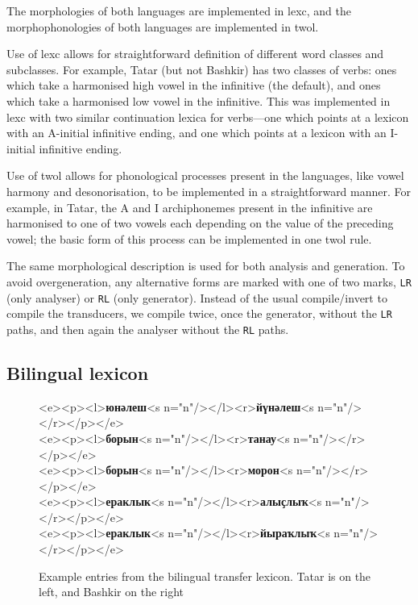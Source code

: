 \documentclass[11pt,a4paper]{article}
\begin{document}
The morphologies of both languages are implemented in lexc, and the morphophonologies of both languages are implemented in twol.

Use of lexc allows for straightforward definition of different word classes and subclasses.  For example, Tatar (but not Bashkir) has two classes of verbs: ones which take a harmonised high vowel in the infinitive (the default), and ones which take a harmonised low vowel in the infinitive.  This was implemented in lexc with two similar continuation lexica for verbs---one which points at a lexicon with an A-initial infinitive ending, and one which points at a lexicon with an I-initial infinitive ending.

Use of twol allows for phonological processes present in the languages, like vowel harmony and desonorisation, to be implemented in a straightforward manner.  For example, in Tatar, the A and I archiphonemes present in the infinitive are harmonised to one of two vowels each depending on the value of the preceding vowel; the basic form of this process can be implemented in one twol rule.

The same morphological description is used for both analysis and generation. To avoid overgeneration, any alternative forms are 
marked with one of two marks, {\tt {\small LR}} (only analyser) or {\tt {\small RL}} (only generator). Instead of the usual
compile/invert to compile the transducers, we compile twice, once the generator, without the {\tt {\small LR}} paths, and
then again the analyser without the {\tt {\small RL}} paths. 

\subsection{Bilingual lexicon}
\begin{figure}
\begin{texttt}
    <e><p><l>\textbf{юнәлеш}<s n="n"/></l><r>\textbf{йүнәлеш}<s n="n"/></r></p></e> \\
    <e><p><l>\textbf{борын}<s n="n"/></l><r>\textbf{танау}<s n="n"/></r></p></e> \\
    <e><p><l>\textbf{борын}<s n="n"/></l><r>\textbf{морон}<s n="n"/></r></p></e> \\
    <e><p><l>\textbf{ераклык}<s n="n"/></l><r>\textbf{алыҫлыҡ}<s n="n"/></r></p></e> \\
    <e><p><l>\textbf{ераклык}<s n="n"/></l><r>\textbf{йыраҡлыҡ}<s n="n"/></r></p></e>
\end{texttt}
\caption{Example entries from the bilingual transfer lexicon. Tatar is on the left, and Bashkir on the right}
\label{fig:bidix}
\end{figure}
\end{document}
